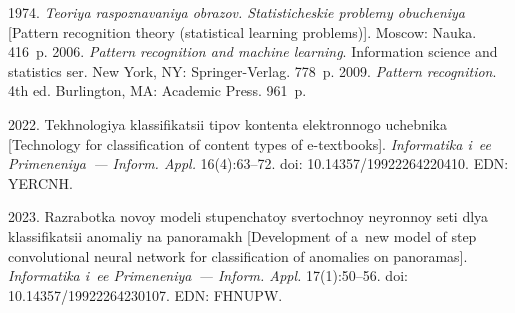   \begin{multicols}{2}

\renewcommand{\bibname}{\protect\rmfamily References}

{\small\frenchspacing
 {%
 \begin{thebibliography}{99}

 1974. \textit{Teo\-riya raspoznavaniya obrazov. 
Statisticheskie problemy obuche\-niya} [Pattern recognition theory (statistical learning 
problems)]. Moscow: Nauka. 416~p.
 2006. \textit{Pattern recognition and machine learning}. Information science and statistics 
ser. New York, NY: 
Springer-Verlag. 778~p.
 2009. \textit{Pattern recognition}. 4th ed. Burlington, MA: Academic Press. 
961~p.
  
 2022. Tekhnologiya klassifikatsii tipov kontenta 
elektronnogo uchebnika [Technology for classification of content types of e-textbooks]. 
\textit{Informatika i~ee Primeneniya~--- Inform. Appl.} 16(4):63--72. doi: 
10.14357/19922264220410. EDN: YERCNH.

 2023. Razrabotka novoy modeli 
stupenchatoy svertochnoy neyronnoy seti dlya klassifikatsii anomaliy na panoramakh 
[Development of a~new model of step convolutional neural network for classification of 
anomalies on panoramas]. \textit{Informatika i~ee Primeneniya~--- Inform. Appl.}   
17(1):50--56. doi: 10.14357/19922264230107. EDN: FHNUPW.  


\end{thebibliography}}}
\end{multicols}
